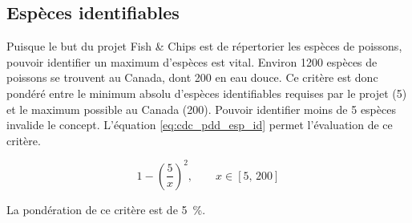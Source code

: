 

\subsection{Espèces identifiables}
\label{s:cdc_pdd_esp_id}

Puisque le but du projet Fish \& Chips est de répertorier les espèces de poissons, pouvoir identifier un maximum d’espèces est vital. Environ 1200 espèces de poissons se trouvent au Canada, dont 200 en eau douce. Ce critère est donc pondéré entre le minimum absolu d’espèces identifiables requises par le projet (5) et le maximum possible au Canada (200). Pouvoir identifier moins de 5 espèces invalide le concept. L’équation \ref{eq:cdc_pdd_esp_id} permet l’évaluation de ce critère. 

\begin{equation} \label{eq:cdc_pdd_esp_id}
1 - \left( \frac{5}{x}\right)^2, \qquad x \in [5,\,200]
\end{equation}

La pondération de ce critère est de 5~\%.
